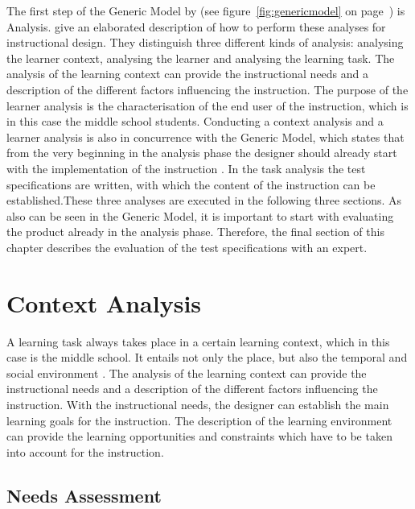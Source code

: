 \documentclass[11pt,twoside]{report} %
\begin{document}
The first step of the Generic Model by  (see figure~\ref{fig:genericmodel} on page~\pageref{fig:genericmodel}) is Analysis.  give an elaborated description of how to perform these analyses for instructional design. They distinguish three different kinds of analysis: analysing the learner context, analysing the learner and analysing the learning task. The analysis of the learning context can provide the instructional needs and a description of the different factors influencing the instruction. The purpose of the learner analysis is the characterisation of the end user of the instruction, which is in this case the middle school students. Conducting a context analysis and a learner analysis is also in concurrence with the Generic Model, which states that from the very beginning in the analysis phase the designer should already start with the implementation of the instruction \cite{genericmodel}. In the task analysis the test specifications are written, with which the content of the instruction can be established.These three analyses are executed in the following three sections. As also can be seen in the Generic Model, it is important to start with evaluating the product already in the analysis phase. Therefore, the final section of this chapter describes the evaluation of the test specifications with an expert.


\chapter{Context Analysis}

A learning task always takes place in a certain learning context, which in this case is the middle school. It entails not only the place, but also the temporal and social environment \cite{smithragan}. The analysis of the learning context can provide the instructional needs and a description of the different factors influencing the instruction. With the instructional needs, the designer can establish the main learning goals for the instruction. The description of the learning environment can provide the learning opportunities and constraints which have to be taken into account for the instruction.


\section{Needs Assessment}
\end{document}
